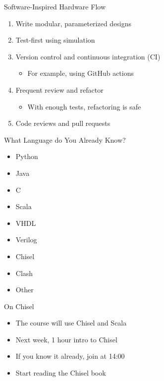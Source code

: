\begin{frame}{Software-Inspired Hardware Flow}
\begin{enumerate}
    \item Write modular, parameterized designs
    \item Test-first using simulation
    \item Version control and continuous integration (CI)
    \begin{itemize}
\item For example, using GitHub actions
\end{itemize}
    \item Frequent review and refactor
    \begin{itemize}
\item With enough tests, refactoring is safe
\end{itemize}
    \item Code reviews and pull requests
\end{enumerate}
\end{frame}


\begin{frame}[fragile]{What Language do You Already Know?}
\begin{itemize}
\item Python
\item Java
\item C
\item Scala
\item VHDL
\item Verilog
\item Chisel
\item Clash
\item Other
\end{itemize}
\end{frame}

\begin{frame}[fragile]{On Chisel}
\begin{itemize}
\item The course will use Chisel and Scala
\item Next week, 1 hour intro to Chisel
\item If you know it already, join at 14:00
\item Start reading the Chisel book
\end{itemize}
\end{frame}

